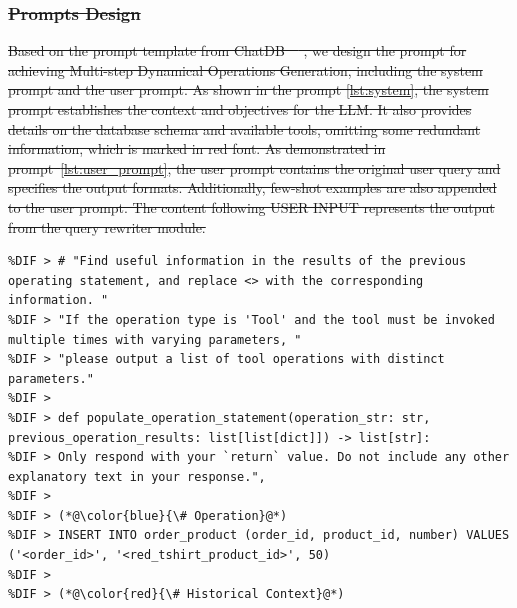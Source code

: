 \documentclass[preprint,12pt]{elsarticle}
\providecommand{\DIFdeltex}[1]{{\protect\color{red}\sout{#1}}}                      %
\providecommand{\DIFaddbegin}{} %
\providecommand{\DIFaddend}{} %
\providecommand{\DIFdelbegin}{} %
\providecommand{\DIFdelend}{} %
\providecommand{\DIFmodbegin}{} %
\providecommand{\DIFmodend}{} %
\providecommand{\DIFdel}[1]{\texorpdfstring{\DIFdeltex{#1}}{}} %
\newcommand{\DIFscaledelfig}{0.5}
\newlength{\DIFdelgraphicswidth} %
\newlength{\DIFdelgraphicsheight} %
\newcommand{\DIFaddincludegraphics}[2][]{{\color{blue}\fbox{\DIFOincludegraphics[#1]{#2}}}} %
\newcommand{\DIFdelincludegraphics}[2][]{%
\sbox{\DIFdelgraphicsbox}{\DIFOincludegraphics[#1]{#2}}%
\settoboxwidth{\DIFdelgraphicswidth}{\DIFdelgraphicsbox} %
\settoboxtotalheight{\DIFdelgraphicsheight}{\DIFdelgraphicsbox} %
\scalebox{\DIFscaledelfig}{%
\parbox[b]{\DIFdelgraphicswidth}{\usebox{\DIFdelgraphicsbox}\\[-\baselineskip] \rule{\DIFdelgraphicswidth}{0em}}\llap{\resizebox{\DIFdelgraphicswidth}{\DIFdelgraphicsheight}{%
\setlength{\unitlength}{\DIFdelgraphicswidth}%
\begin{picture}(1,1)%
\thicklines\linethickness{2pt} %
{\color[rgb]{1,0,0}\put(0,0){\framebox(1,1){}}}%
{\color[rgb]{1,0,0}\put(0,0){\line( 1,1){1}}}%
{\color[rgb]{1,0,0}\put(0,1){\line(1,-1){1}}}%
\end{picture}%
}\hspace*{3pt}}} %
} %
\DeclareRobustCommand{\DIFaddbegin}{\DIFOaddbegin \let\includegraphics\DIFaddincludegraphics} %
\DeclareRobustCommand{\DIFaddend}{\DIFOaddend \let\includegraphics\DIFOincludegraphics} %
\DeclareRobustCommand{\DIFdelbegin}{\DIFOdelbegin \let\includegraphics\DIFdelincludegraphics} %
\DeclareRobustCommand{\DIFdelend}{\DIFOaddend \let\includegraphics\DIFOincludegraphics} %
\begin{document}
\DIFdelbegin \subsubsection{\DIFdel{Prompts Design}}
\addtocounter{subsubsection}{-1}%
\DIFdel{Based on the prompt template from ChatDB~\mbox{%
\cite{hu2023chatdb}}\hspace{0pt}%
, we design the prompt for achieving Multi-step Dynamical Operations Generation, including the system prompt and the user prompt.
As shown in the prompt \ref{lst:system}, the system prompt establishes the context and objectives for the LLM. 
It also provides details on the database schema and available tools, omitting some redundant information, which is marked in red font.
As demonstrated in prompt~\ref{lst:user_prompt}, the user prompt contains the original user query and specifies the output formats.
Additionally, few-shot examples are also appended to the user prompt.
The content following USER INPUT represents the output from the query rewriter module.
}\DIFdelend \DIFaddbegin \DIFmodbegin
\begin{lstlisting}[style=prompt, label={lst:param_prompt},caption={Parameters Identification prompt},numberstyle=\scriptsize,aboveskip=0pt, belowskip=0pt,alsolanguage=DIFcode]
%DIF > You are now the following python function: 
%DIF > # "Find useful information in the results of the previous operating statement, and replace <> with the corresponding information. "
%DIF > "If the operation type is 'Tool' and the tool must be invoked multiple times with varying parameters, "
%DIF > "please output a list of tool operations with distinct parameters."
%DIF >         
%DIF > def populate_operation_statement(operation_str: str, previous_operation_results: list[list[dict]]) -> list[str]:
%DIF > Only respond with your `return` value. Do not include any other explanatory text in your response.",
%DIF > 
%DIF > (*@\color{blue}{\# Operation}@*)
%DIF > INSERT INTO order_product (order_id, product_id, number) VALUES ('<order_id>', '<red_tshirt_product_id>', 50)
%DIF > 
%DIF > (*@\color{red}{\# Historical Context}@*)
\end{lstlisting}
\DIFmodend
\DIFaddend 
\end{document}
